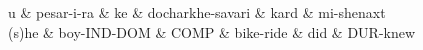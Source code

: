 \documentclass{standalone}
\begin{document}
 
\begin{dependency}[theme = simple, arc edge, arc angle=70, text only label, label style={above, font = \footnotesize} ]
\begin{deptext}[column sep=.1ex, row sep = .15ex]
	u \&  pesar-i-ra \& ke \& docharkhe-savari \& kard \& mi-shenaxt \\
	(s)he \& boy-IND-DOM \& COMP \& bike-ride \& did \& DUR-knew \\
\end{deptext}
\end{dependency}
\end{document}

